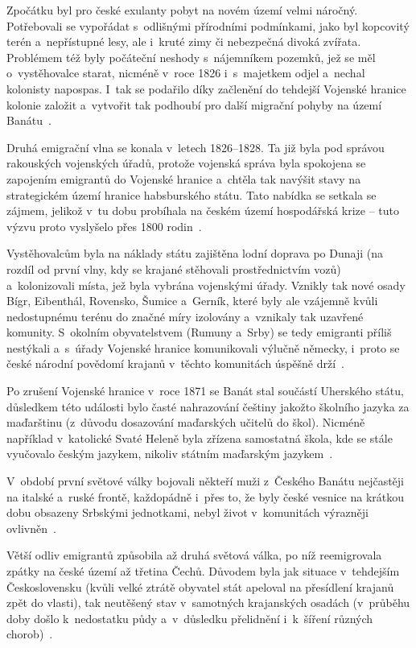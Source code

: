 Zpočátku byl pro české exulanty pobyt na novém území velmi náročný. Potřebovali se vypořádat s~odlišnými přírodními podmínkami, jako byl kopcovitý terén a~nepřístupné lesy, ale i~kruté zimy či nebezpečná divoká zvířata. Problémem též byly počáteční neshody s~nájemníkem pozemků, jež se měl o~vystěhovalce starat, nicméně v~roce 1826 i~s~majetkem odjel a~nechal kolonisty napospas. I~tak se podařilo díky začlenění do tehdejší Vojenské hranice kolonie založit a~vytvořit tak podhoubí pro další migrační pohyby na území Banátu~\parencite{Secka1995}.

Druhá emigrační vlna se konala v~letech 1826--1828. Ta již byla pod správou rakouských vojenských úřadů, protože vojenská správa byla spokojena se zapojením emigrantů do Vojenské hranice a~chtěla tak navýšit stavy na strategickém území hranice habsburského státu. Tato nabídka se setkala se zájmem, jelikož v~tu dobu probíhala na českém území hospodářská krize -- tuto výzvu proto vyslyšelo přes 1800 rodin~\parencite{Frnochova2012}.

Vystěhovalcům byla na náklady státu zajištěna lodní doprava po Dunaji (na rozdíl od první vlny, kdy se krajané stěhovali prostřednictvím vozů) a~kolonizovali místa, jež byla vybrána vojenskými úřady. Vznikly tak nové osady Bígr, Eibenthál, Rovensko, Šumice a~Gerník, které byly ale vzájemně kvůli nedostupnému terénu do značné míry izolovány a~vznikaly tak uzavřené komunity. S~okolním obyvatelstvem (Rumuny a~Srby) se tedy emigranti příliš nestýkali a~s~úřady Vojenské hranice komunikovali výlučně německy, i~proto se české národní povědomí krajanů v~těchto komunitách úspěšně drží~\parencite{Secka1995}.

Po zrušení Vojenské hranice v~roce 1871 se Banát stal součástí Uherského státu, důsledkem této události bylo časté nahrazování češtiny jakožto školního jazyka za maďarštinu (z~důvodu dosazování maďarských učitelů do škol). Nicméně například v~katolické Svaté Heleně byla zřízena samostatná škola, kde se stále vyučovalo českým jazykem, nikoliv státním maďarským jazykem~\parencite{Gecse2013}.

V~období první světové války bojovali někteří muži z~Českého Banátu nejčastěji na italské a~ruské frontě, každopádně i~přes to, že byly české vesnice na krátkou dobu obsazeny Srbskými jednotkami, nebyl život v~komunitách výrazněji ovlivněn~\parencite{Gecse2013}.

Větší odliv emigrantů způsobila až druhá světová válka, po níž reemigrovala zpátky na české území až třetina Čechů. Důvodem byla jak situace v~tehdejším Československu (kvůli velké ztrátě obyvatel stát apeloval na přesídlení krajanů zpět do vlasti), tak neutěšený stav v~samotných krajanských osadách (v~průběhu doby došlo k~nedostatku půdy a~v~důsledku přelidnění i~k~šíření různých chorob)~\parencite{Secka1995}.

